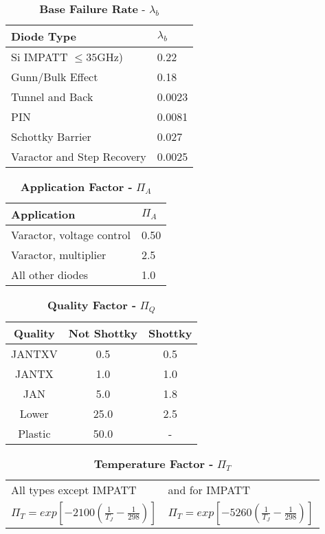 \begin{table}
\caption{\textbf{Base Failure Rate} - $\lambda_{b}$}
\label{table:baseFailureRateDiodeHigh}
\begin{tabular}{|l|m{10cm}|} \hline
\textbf{Diode Type} & $\lambda_{b}$ \\ \hline
Si IMPATT $\leq 35$GHz) & 0.22 \\ \hline
Gunn/Bulk Effect & 0.18 \\ \hline
Tunnel and Back & 0.0023 \\ \hline
PIN & 0.0081 \\ \hline
Schottky Barrier & 0.027 \\ \hline
Varactor and Step Recovery & 0.0025 \\ \hline
\end{tabular}
\end{table}

\begin{table}
\caption{\textbf{Application Factor -} $\Pi_{A}$}
\label{table:applicationFactorHigh}
\begin{tabular}{|l|m{10cm}|} \hline
\textbf{Application} & $\Pi_{A}$ \\ \hline
Varactor, voltage control & 0.50 \\ \hline
Varactor, multiplier & 2.5 \\ \hline
All other diodes & 1.0 \\ \hline
\end{tabular}
\end{table}

\begin{table}
\caption{\textbf{Quality Factor -} $\Pi_{Q}$}
\label{table:applicationFactorHigh}
\begin{tabular}{|c|c|c|} \hline
\textbf{Quality} & \textbf{Not Shottky} & \textbf{Shottky} \\ \hline
JANTXV & 0.5 & 0.5 \\ \hline
JANTX & 1.0 & 1.0 \\ \hline
JAN & 5.0 & 1.8 \\ \hline
Lower & 25.0 & 2.5 \\ \hline
Plastic & 50.0 & - \\ \hline
\end{tabular}
\end{table}


\begin{table}
\caption{\textbf{Temperature Factor -} $\Pi_{T}$  }
\label{table:temperatureFactorHigh}
\begin{tabular}{l l}  
All types except IMPATT & and for IMPATT \\
$\Pi_{T} = exp[-2100(\frac{1}{T_{J}} - \frac{1}{298})]$ & 
$\Pi_{T} = exp[-5260(\frac{1}{T_{J}} - \frac{1}{298})]$ \\ 
\end{tabular}
\end{table}


